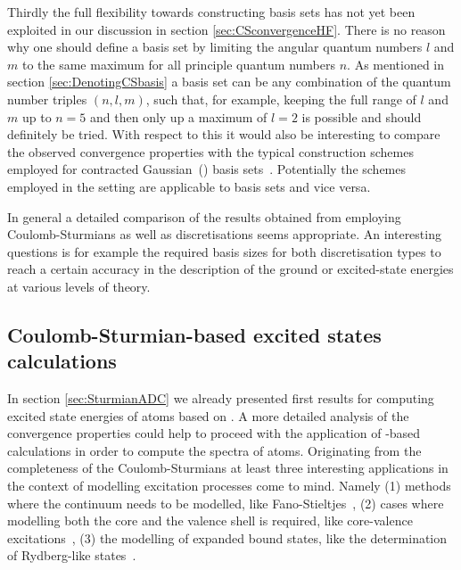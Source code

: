 Thirdly the full flexibility towards constructing \CS basis sets has not yet
been exploited in our discussion in section \vref{sec:CSconvergenceHF}.
There is no reason why one should define a basis set
by limiting the angular quantum numbers $l$ and $m$ to the same maximum for all
principle quantum numbers $n$.
As mentioned in section \vref{sec:DenotingCSbasis} a \CS basis set can be any
combination of the quantum number triples $(n, l, m)$,
such that, for example, keeping the full range of $l$ and $m$
up to $n=5$ and then only up a maximum of $l=2$ is possible
and should definitely be tried.
With respect to this it would also be interesting to compare the
observed convergence properties with the typical construction schemes
employed for contracted Gaussian~(\cGTO) basis sets~\cite{Jensen2013,Hill2013}.
Potentially the schemes employed in the \cGTO setting are applicable
to \CS basis sets and vice versa.

In general a detailed comparison of the results obtained
from employing Coulomb-Sturmians as well as \cGTO discretisations seems appropriate.
An interesting questions is for example the required basis sizes for both
discretisation types to reach a certain accuracy
in the description of the ground or excited-state energies
at various levels of theory.

\subsection{Coulomb-Sturmian-based excited states calculations}
In section \vref{sec:SturmianADC} we already presented
first results for computing excited state energies of atoms based on \ADC.
A more detailed analysis of the convergence properties
could help to proceed with the application of \CS-based \ADC
calculations in order to compute the spectra of atoms.
Originating from the completeness of the Coulomb-Sturmians
at least three interesting applications in the context of modelling
excitation processes come to mind. Namely
(1) methods where the continuum needs to be modelled,
like Fano-Stieltjes~\cite{Feshbach1958,Feshbach1962,Santra2002},
(2) cases where modelling both the core and the valence shell is required,
like core-valence excitations~\cite{Wenzel2014,Wenzel2016},
(3) the modelling of expanded bound states,
like the determination of Rydberg-like states~\cite{Kaufmann1989,Riss1993}.

